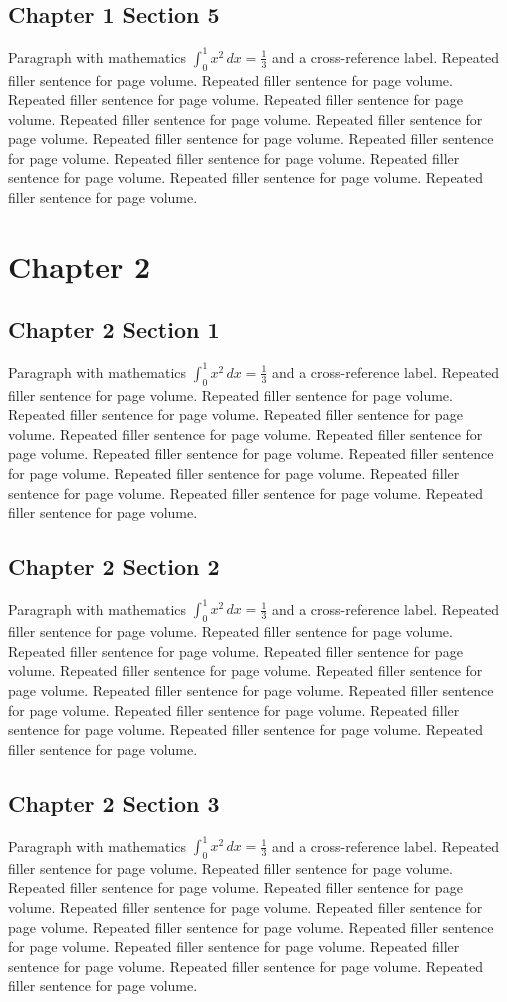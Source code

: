 \documentclass[11pt]{report}
\begin{document}
\section{Chapter 1 Section 5}
Paragraph with mathematics $\int_0^1 x^2\,dx = \frac13$ and a cross-reference label.
\label{sec:1:5}
Repeated filler sentence for page volume. Repeated filler sentence for page volume. Repeated filler sentence for page volume. Repeated filler sentence for page volume. Repeated filler sentence for page volume. Repeated filler sentence for page volume. Repeated filler sentence for page volume. Repeated filler sentence for page volume. Repeated filler sentence for page volume. Repeated filler sentence for page volume. Repeated filler sentence for page volume. Repeated filler sentence for page volume. 
\chapter{Chapter 2}
\section{Chapter 2 Section 1}
Paragraph with mathematics $\int_0^1 x^2\,dx = \frac13$ and a cross-reference label.
\label{sec:2:1}
Repeated filler sentence for page volume. Repeated filler sentence for page volume. Repeated filler sentence for page volume. Repeated filler sentence for page volume. Repeated filler sentence for page volume. Repeated filler sentence for page volume. Repeated filler sentence for page volume. Repeated filler sentence for page volume. Repeated filler sentence for page volume. Repeated filler sentence for page volume. Repeated filler sentence for page volume. Repeated filler sentence for page volume. 
\section{Chapter 2 Section 2}
Paragraph with mathematics $\int_0^1 x^2\,dx = \frac13$ and a cross-reference label.
\label{sec:2:2}
Repeated filler sentence for page volume. Repeated filler sentence for page volume. Repeated filler sentence for page volume. Repeated filler sentence for page volume. Repeated filler sentence for page volume. Repeated filler sentence for page volume. Repeated filler sentence for page volume. Repeated filler sentence for page volume. Repeated filler sentence for page volume. Repeated filler sentence for page volume. Repeated filler sentence for page volume. Repeated filler sentence for page volume. 
\section{Chapter 2 Section 3}
Paragraph with mathematics $\int_0^1 x^2\,dx = \frac13$ and a cross-reference label.
\label{sec:2:3}
Repeated filler sentence for page volume. Repeated filler sentence for page volume. Repeated filler sentence for page volume. Repeated filler sentence for page volume. Repeated filler sentence for page volume. Repeated filler sentence for page volume. Repeated filler sentence for page volume. Repeated filler sentence for page volume. Repeated filler sentence for page volume. Repeated filler sentence for page volume. Repeated filler sentence for page volume. Repeated filler sentence for page volume. 
\end{document}
